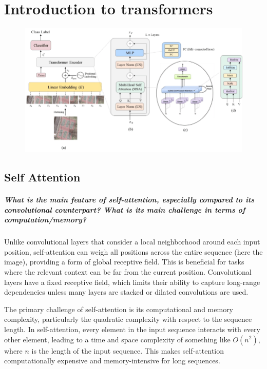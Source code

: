 \chapter{Introduction to transformers}

\begin{figure}[H]
    \centering
    \includegraphics*[width=.8\textwidth]{figs/Transformers/The-Vision-Transformer-architecture-a-the-main-architecture-of-the-model-b-the.png}
\end{figure}

\section{Self Attention}
\paragraph{What is the main feature of self-attention, especially compared to its convolutional counterpart? What is its main challenge in terms of computation/memory?}
Unlike convolutional layers that consider a local neighborhood around each input position, self-attention can weigh all positions across the entire sequence (here the image), providing a form of global receptive field. This is beneficial for tasks where the relevant context can be far from the current position. Convolutional layers have a fixed receptive field, which limits their ability to capture long-range dependencies unless many layers are stacked or dilated convolutions are used. 

The primary challenge of self-attention is its computational and memory complexity, particularly the quadratic complexity with respect to the sequence length. In self-attention, every element in the input sequence interacts with every other element, leading to a time and space complexity of something like $ O(n^2) $, where $n$ is the length of the input sequence. This makes self-attention computationally expensive and memory-intensive for long sequences.

